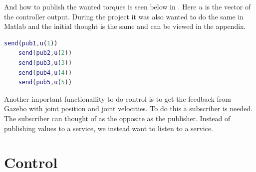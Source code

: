 And how to publish the wanted torques is seen below in . Here $u$ is the vector of the controller output. During the project it was also wanted to do the same in Matlab and the initial thought is the same and can be viewed in the appendix. 

\begin{lstlisting}[language=Matlab,caption={MATLAB code for publish wanted joint torques},label={lst:matlabPubs}]
    send(pub1,u(1))
    send(pub2,u(2))
    send(pub3,u(3))
    send(pub4,u(4))
    send(pub5,u(5))
\end{lstlisting}

Another important functionallity to do control is to get the feedback from Gazebo with joint position and joint velocities. To do this a subscriber is needed. The subscriber can thought of as the opposite as the publisher. Instead of publishing values to a service, we instead want to listen to a service. 


\section{Control}

